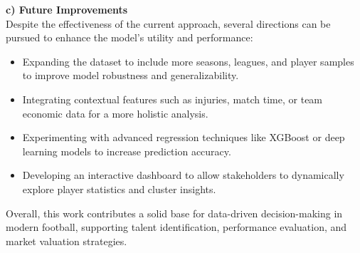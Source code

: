 \documentclass[a4paper,12pt]{article}
\begin{document}
\textbf{c) Future Improvements} \\
Despite the effectiveness of the current approach, several directions can be pursued to enhance the model’s utility and performance:
\begin{itemize}
    \item Expanding the dataset to include more seasons, leagues, and player samples to improve model robustness and generalizability.
    \item Integrating contextual features such as injuries, match time, or team economic data for a more holistic analysis.
    \item Experimenting with advanced regression techniques like XGBoost or deep learning models to increase prediction accuracy.
    \item Developing an interactive dashboard to allow stakeholders to dynamically explore player statistics and cluster insights.
\end{itemize}
Overall, this work contributes a solid base for data-driven decision-making in modern football, supporting talent identification, performance evaluation, and market valuation strategies.
\end{document}
